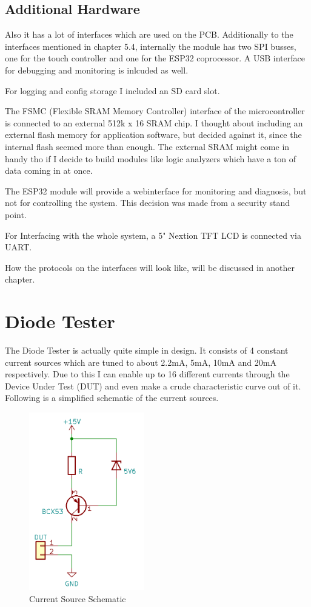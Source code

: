 \subsection{Additional Hardware}

Also it has a lot of interfaces which are used on the PCB. Additionally to the interfaces mentioned in chapter 5.4, internally the module has two SPI busses, one for the touch controller and one for the ESP32 coprocessor. A USB interface for debugging and monitoring is inlcuded as well. 

For logging and config storage I included an SD card slot. 

The FSMC (Flexible SRAM Memory Controller) interface of the microcontroller is connected to an external 512k x 16 SRAM chip. I thought about including an external flash memory for application software, but decided against it, since the internal flash seemed more than enough. The external SRAM might come in handy tho if I decide to build modules like logic analyzers which have a ton of data coming in at once. 

The ESP32 module will provide a webinterface for monitoring and diagnosis, but not for controlling the system. This decision was made from a security stand point. 

For Interfacing with the whole system, a 5" Nextion TFT LCD is connected via UART. 

How the protocols on the interfaces will look like, will be discussed in another chapter. 


\section{Diode Tester}
The Diode Tester is actually quite simple in design. It consists of 4 constant current sources which are tuned to about 2.2mA, 5mA, 10mA and 20mA respectively. Due to this I can enable up to 16 different currents through the Device Under Test (DUT) and even make a crude characteristic curve out of it. 
Following is a simplified schematic of the current sources.

\begin{figure}[H]
	\centering
		\includegraphics[width=5cm]{pictures/cc_source.png}
	\caption{Current Source Schematic}
	\label{img:CC_Diode}
\end{figure}

